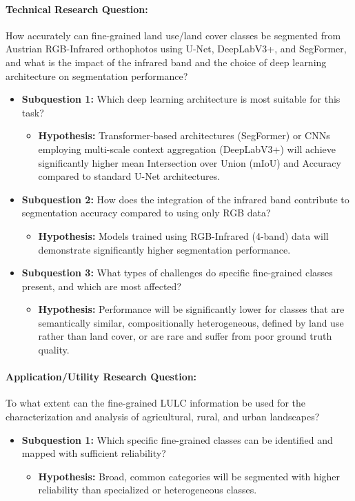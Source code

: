 \documentclass{report}
\begin{document}
\paragraph{Technical Research Question:} How accurately can fine-grained land use/land cover classes be segmented from Austrian RGB-Infrared orthophotos using U-Net, DeepLabV3+, and SegFormer, and what is the impact of the infrared band and the choice of deep learning architecture on segmentation performance?
\begin{itemize}
\item \textbf{Subquestion 1:} Which deep learning architecture is most suitable for this task?
\begin{itemize}
\item \textbf{Hypothesis:} Transformer-based architectures (SegFormer) or CNNs employing multi-scale context aggregation (DeepLabV3+) will achieve significantly higher mean Intersection over Union (mIoU) and Accuracy compared to standard U-Net architectures.
\end{itemize}
\item \textbf{Subquestion 2:} How does the integration of the infrared band contribute to segmentation accuracy compared to using only RGB data?
\begin{itemize}
\item \textbf{Hypothesis:} Models trained using RGB-Infrared (4-band) data will demonstrate significantly higher segmentation performance.
\end{itemize}
\item \textbf{Subquestion 3:} What types of challenges do specific fine-grained classes present, and which are most affected?
\begin{itemize}
\item \textbf{Hypothesis:} Performance will be significantly lower for classes that are semantically similar, compositionally heterogeneous, defined by land use rather than land cover, or are rare and suffer from poor ground truth quality.
\end{itemize}
\end{itemize}
\paragraph{Application/Utility Research Question:} To what extent can the fine-grained LULC information be used for the characterization and analysis of agricultural, rural, and urban landscapes?
\begin{itemize}
\item \textbf{Subquestion 1:} Which specific fine-grained classes can be identified and mapped with sufficient reliability?
\begin{itemize}
\item \textbf{Hypothesis:} Broad, common categories will be segmented with higher reliability than specialized or heterogeneous classes.
\end{itemize}
\end{itemize}
\end{document}
